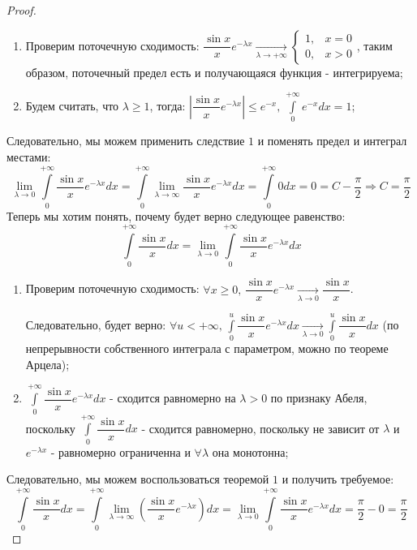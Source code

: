 \documentclass[12pt]{article}
\theoremstyle{definition}
\newcommand{\ddint}[2]{\displaystyle\int\limits_{#1}^{#2}}
\begin{document}
\begin{proof}
	\begin{enumerate}[label=(\arabic*)]
		\item Проверим поточечную сходимость: $
			\dfrac{\sin{x}}{x}e^{-\lambda x} \xrightarrow[\lambda \to +\infty]{} \left\{
			\begin{array}{ll}
				1, & x = 0 \\
				0,& x > 0
			\end{array}
			\right.$, таким образом, поточечный предел есть и получающаяся функция - интегрируема;
		\item Будем считать, что $\lambda \geq 1$, тогда: $\left|\dfrac{\sin{x}}{x}e^{-\lambda x}\right| \leq e^{-x}, \, \ddint{0}{+\infty}e^{-x}dx = 1$;
	\end{enumerate}
	Следовательно, мы можем применить следствие $1$ и поменять предел и интеграл местами:
	$$
		\lim\limits_{\lambda \to 0}\ddint{0}{+\infty}\dfrac{\sin{x}}{x}e^{-\lambda x}dx = \ddint{0}{+\infty}\lim\limits_{\lambda \to \infty}\dfrac{\sin{x}}{x}e^{-\lambda x}dx = \ddint{0}{+\infty}0dx = 0 = C - \dfrac{\pi}{2} \Rightarrow C = \dfrac{\pi}{2}
	$$
	Теперь мы хотим понять, почему будет верно следующее равенство:
	$$
		\ddint{0}{+\infty}\dfrac{\sin{x}}{x}dx = \lim\limits_{\lambda \to 0}\ddint{0}{+\infty}\dfrac{\sin{x}}{x}e^{-\lambda x}dx
	$$
	\begin{enumerate}[label=(\arabic*)]
		\item Проверим поточечную сходимость: $\forall x \geq 0, \,
		\dfrac{\sin{x}}{x}e^{-\lambda x} \xrightarrow[\lambda \to 0]{} \dfrac{\sin{x}}{x}$. 
		
		Следовательно, будет верно: $\forall u < +\infty, \, \ddint{0}{u}\dfrac{\sin{x}}{x}e^{-\lambda x}dx \xrightarrow[\lambda \to 0]{}\ddint{0}{u}\dfrac{\sin{x}}{x}dx$ (по непрерывности собственного интеграла с параметром, можно по теореме Арцела);
		
		\item $\ddint{0}{+\infty}\dfrac{\sin{x}}{x}e^{-\lambda x}dx$ - сходится равномерно на $\lambda > 0$ по признаку Абеля, поскольку $\ddint{0}{+\infty}\dfrac{\sin{x}}{x}dx$ - сходится равномерно, поскольку не зависит от $\lambda$ и $e^{-\lambda x}$ - равномерно ограниченна и $\forall \lambda$ она монотонна;
	\end{enumerate}
	Следовательно, мы можем воспользоваться теоремой $1$ и получить требуемое:
	$$
		\ddint{0}{+\infty}\dfrac{\sin{x}}{x}dx = \ddint{0}{+\infty} \lim\limits_{\lambda \to \infty}\left(\dfrac{\sin{x}}{x}e^{-\lambda x}\right)dx = \lim\limits_{\lambda \to 0}\ddint{0}{+\infty}\dfrac{\sin{x}}{x}e^{-\lambda x}dx = \dfrac{\pi}{2} - 0 = \dfrac{\pi}{2}
	$$
\end{proof}
\newpage
\end{document}
